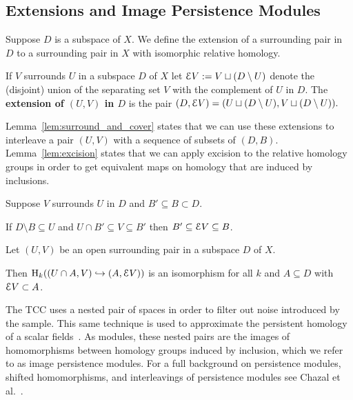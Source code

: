 \subsection{Extensions and Image Persistence Modules}

Suppose $D$ is a subspace of $X$.
We define the extension of a surrounding pair in $D$ to a surrounding pair in $X$ with isomorphic relative homology.

\begin{definition}[Extension]
  If $V$ surrounds $U$ in a subspace $D$ of $X$ let $\mathcal{E} V := V\sqcup (D\setminus U)$ denote the (disjoint) union of the separating set $V$ with the complement of $U$ in $D$.
  The \textbf{extension of $(U, V)$ in $D$} is the pair $(D, \mathcal{E} V) = (U\sqcup (D\setminus U), V\sqcup (D\setminus U)).$
\end{definition}

Lemma~\ref{lem:surround_and_cover} states that we can use these extensions to interleave a pair $(U, V)$ with a sequence of subsets of $(D, B)$.
Lemma~\ref{lem:excision} states that we can apply excision to the relative homology groups in order to get equivalent maps on homology that are induced by inclusions.

\begin{lemma}\label{lem:surround_and_cover}
  Suppose $V$ surrounds $U$ in $D$ and $B'\subseteq B\subset D$.

  If $D\setminus B\subseteq U$ and $U\cap B'\subseteq V\subseteq B'$ then $B'\subseteq \mathcal{E} V\subseteq B$.
\end{lemma}

\begin{lemma}\label{lem:excision}
  Let $(U, V)$ be an open surrounding pair in a subspace $D$ of $X$.

  Then $\mathrm{H}_k((U\cap A, V)\hookrightarrow (A, \mathcal{E} V))$ is an isomorphism for all $k$ and $A\subseteq D$ with $\mathcal{E} V\subset A$.
\end{lemma}

The TCC uses a nested pair of spaces in order to filter out noise introduced by the sample.
This same technique is used to approximate the persistent homology of a scalar fields~\cite{chazal09analysis}.
As modules, these nested pairs are the images of homomorphisms between homology groups induced by inclusion, which we refer to as image persistence modules.
For a full background on persistence modules, shifted homomorphisms, and interleavings of persistence modules see Chazal et al.~\cite{chazal13structure}.

